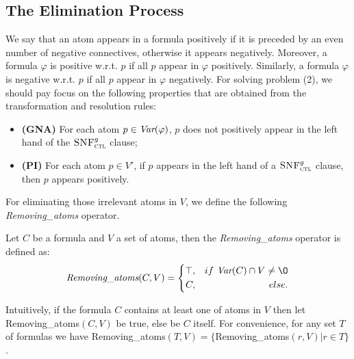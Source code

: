 \documentclass[letterpaper]{article}
\begin{document}
\subsection{The Elimination Process}
We say that an atom appears in a formula positively if it is preceded by an even number of negative connectives, otherwise it appears negatively. Moreover, a formula $\varphi$ is positive w.r.t. $p$ if all $p$ appear in $\varphi$ positively. Similarly, a formula $\varphi$ is negative w.r.t. $p$ if all $p$ appear in $\varphi$ negatively.
For solving problem (2), we should pay focus on the following properties that are obtained from the transformation and resolution rules:
\begin{itemize}
  \item \textbf{(GNA)} For each atom $p \in  \textit{Var}(\varphi)$, $p$ does not positively appear in the left hand of the ${\textsc{SNF}_{\textsc{ctl}}^g}$ clause;
  \item \textbf{(PI)} For each atom $p\in V'$, if $p$ appears in the left hand of a ${\textsc{SNF}_{\textsc{ctl}}^g}$ clause, then $p$ appears positively.
\end{itemize}



For eliminating those irrelevant atoms in $V$, we define the following \emph{Removing\_atoms} operator.

\begin{definition}\label{def:Elm}
Let $C$ be a formula and $V$ a set of atoms, then the \emph{Removing\_atoms} operator is defined as:
$$ \emph{Removing\_atoms}(C, V)=\left\{
\begin{aligned}
\top, && if\ \Var(C) \cap V \neq {\O} \\
C, && else.
\end{aligned}
\right.
$$
\end{definition}
Intuitively, if the formula $C$ contains at least one of atoms in $V$ then let Removing\_atoms$(C, V)$ be true, else be $C$ itself.
For convenience, for any set $T$ of formulas we have Removing\_atoms$(T, V) = \{$Removing\_atoms$(r, V) | r \in T\}$.
\end{document}
